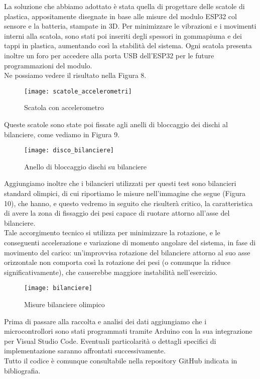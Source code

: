 \documentclass[fleqn,10pt]{SelfArx} %
\begin{document}
La soluzione che abbiamo adottato è stata quella di progettare delle scatole di plastica, appositamente 
disegnate in base alle misure del modulo ESP32 col sensore e la batteria, stampate in 3D. Per minimizzare le vibrazioni 
e i movimenti interni alla scatola, sono stati poi inseriti degli spessori in gommapiuma e dei tappi in plastica, 
aumentando così la stabilità del sistema. Ogni scatola presenta inoltre un foro per accedere alla porta USB dell'ESP32 
per le future programmazioni del modulo.\\
Ne possiamo vedere il risultato nella Figura 8.

\begin{figure}[htb!]\centering
	\texttt{[image: scatole\_accelerometri]}
	\caption{Scatola con accelerometro}
	\label{fig:modulo accelerometro}
\end{figure}

Queste scatole sono state poi fissate agli anelli di bloccaggio dei dischi al bilanciere, come vediamo in Figura 9.

\begin{figure}[htb!]\centering
	\texttt{[image: disco\_bilanciere]}
	\caption{Anello di bloccaggio dischi su bilanciere}
	\label{fig:anello di bloccaggio}
\end{figure}

Aggiungiamo inoltre che i bilancieri utilizzati per questi test sono bilancieri standard olimpici, di cui riportiamo 
le misure nell'immagine che segue (Figura 10), che hanno, e questo vedremo in seguito che risulterà critico, 
la caratteristica di avere la zona di fissaggio dei pesi capace di ruotare attorno all'asse del bilanciere. \\
Tale accorgimento tecnico si utilizza per minimizzare la rotazione, e le conseguenti accelerazione e variazione 
di momento angolare del sistema, in fase di movimento del carico: un'improvvisa rotazione del bilanciere attorno 
al suo asse orizzontale non comporta così la rotazione dei pesi (o comunque la riduce significativamente), 
che causerebbe maggiore instabilità nell'esercizio.

\begin{figure}[htb!]\centering
	\texttt{[image: bilanciere]}
	\caption{Misure bilanciere olimpico}
	\label{fig:bilanciere}
\end{figure}

Prima di passare alla raccolta e analisi dei dati aggiungiamo che i microcontrollori sono stati 
programmati tramite Arduino con la sua integrazione per Visual Studio Code. Eventuali particolarità o dettagli specifici di 
implementazione saranno affrontati successivamente. \\
Tutto il codice è comunque consultabile nella repository GitHub \cite{GitHub} indicata in bibliografia.
\end{document}
